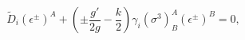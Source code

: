\begin{equation}
\tilde
D_i(\epsilon^{\pm})^A+(\pm\frac{g'}{2g}-\frac{k}{2})\gamma_i
(\sigma^3)^A_B (\epsilon^\pm)^B=0,
\end{equation}

